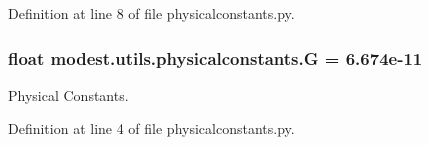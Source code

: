 Definition at line 8 of file physicalconstants.\+py.

\subsubsection[{\texorpdfstring{G}{G}}]{\setlength{\rightskip}{0pt plus 5cm}float modest.\+utils.\+physicalconstants.\+G = 6.\+674e-\/11}\hypertarget{namespacemodest_1_1utils_1_1physicalconstants_a4dbf6992bb8dc7fb3f56e2c16f6a44f6}{}\label{namespacemodest_1_1utils_1_1physicalconstants_a4dbf6992bb8dc7fb3f56e2c16f6a44f6}


Physical Constants. 



Definition at line 4 of file physicalconstants.\+py.

